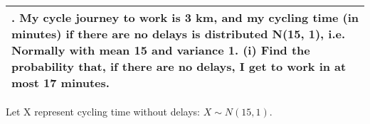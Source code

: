 \documentclass[a4paper,12pt]{article}
\begin{document}
\begin{table}[ht!]
     \centering
     \begin{tabular}{|p{15cm}|}
     \hline        
\noindent 4. My cycle journey to work is 3 km, and my cycling time (in minutes) if there are no delays is distributed N(15, 1), i.e. Normally with mean 15 and variance 1.
(i) Find the probability that, if there are no delays, I get to work in at most 17 minutes.

\\ \hline
      \end{tabular}
    \end{table}






Let X represent cycling time without delays: $X \sim N(15, 1)$.
\end{document}
